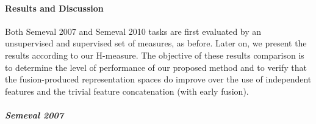 %



\paragraph{Results and Discussion}
Both Semeval 2007 and Semeval 2010 tasks are first evaluated by an unsupervised and supervised set of measures, as before. Later on, we present the results according to our H-measure. The objective of these results comparison is to determine the level of performance of our proposed method and to verify that the fusion-produced representation spaces do improve over the use of independent features and the trivial feature concatenation (with early fusion).

\subparagraph{Semeval 2007}



